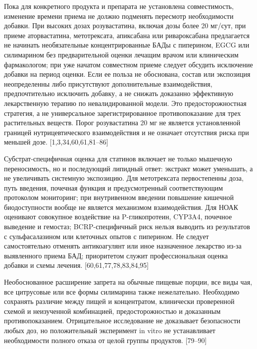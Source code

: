 \documentclass[11pt]{article}
\begin{document}
Пока для конкретного продукта и препарата не установлена совместимость, изменение времени приема не должно подменять пересмотр необходимости добавки. При высоких дозах розувастатина, включая дозы более 20 мг/сут, при приеме аторвастатина, метотрексата, апиксабана или ривароксабана предлагается не начинать необязательные концентрированные БАДы с пиперином, EGCG или силимарином без предварительной оценки лечащим врачом или клиническим фармакологом; при уже начатом совместном приеме следует обсудить исключение добавки на период оценки. Если ее польза не обоснована, состав или экспозиция неопределенны либо присутствуют дополнительные взаимодействия, предпочтительно исключить добавку, а не снижать доказанно эффективную лекарственную терапию по невалидированной модели. Это предосторожностная стратегия, а не универсальное зарегистрированное противопоказание для трех растительных веществ. Порог розувастатина 20 мг не является установленной границей нутрицевтического взаимодействия и не означает отсутствия риска при меньшей дозе. [1,3,34,60,61,81--86]

Субстрат-специфичная оценка для статинов включает не только мышечную переносимость, но и последующий липидный ответ: экстракт может уменьшать, а не увеличивать системную экспозицию. Для метотрексата первостепенны доза, путь введения, почечная функция и предусмотренный соответствующим протоколом мониторинг; при внутривенном введении повышение кишечной биодоступности вообще не является механизмом взаимодействия. Для НОАК оценивают совокупное воздействие на P-гликопротеин, CYP3A4, почечное выведение и гемостаз; BCRP-специфичный риск нельзя выводить из результатов с сульфасалазином или клеточных опытов с пиперином. Не следует самостоятельно отменять антикоагулянт или иное назначенное лекарство из-за выявленного приема БАД; приоритетом служит профессиональная оценка добавки и схемы лечения. [60,61,77,78,83,84,95]

Необоснованное расширение запрета на обычные пищевые порции, все виды чая, все цитрусовые или все формы силимарина также нежелательно. Необходимо сохранять различие между пищей и концентратом, клинически проверенной схемой и неизученной комбинацией, предосторожностью и доказанным противопоказанием. Отрицательное исследование не доказывает безопасности любых доз, но положительный эксперимент in vitro не устанавливает необходимости полного отказа от целой группы продуктов. [79--90]
\end{document}
